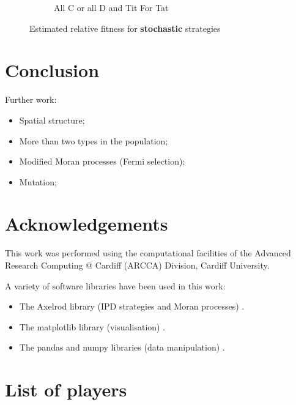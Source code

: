 \documentclass{article}
\begin{document}
\begin{figure}[!hbtp]
\begin{subfigure}[t]{.3\textwidth}
        \caption{All C or all D and Tit For Tat}
    \end{subfigure}%
    \caption{Estimated relative fitness
             for \textbf{stochastic} strategies}
    \label{fig:comparison_stochastic}
\end{figure}



\section{Conclusion}\label{sec:conclusion}


Further work:

\begin{itemize}
    \item Spatial structure;
    \item More than two types in the population;
    \item Modified Moran processes (Fermi selection);
    \item Mutation;
\end{itemize}

\section*{Acknowledgements}

This work was performed using the computational facilities of the Advanced
Research Computing @ Cardiff (ARCCA) Division, Cardiff University.

A variety of software libraries have been used in this work:

\begin{itemize}
    \item The Axelrod library (IPD strategies and Moran processes)
        \cite{axelrodproject}.
    \item The matplotlib library (visualisation) \cite{hunter2007matplotlib}.
    \item The pandas and numpy libraries (data manipulation)
        \cite{mckinney2010data, walt2011numpy}.
\end{itemize}

\printbibliography

\appendix

\section{List of players}\label{app:list_of_players}

\begin{multicols}{3}
	\begin{enumerate}
		
	\end{enumerate}
\end{multicols}
\end{document}
